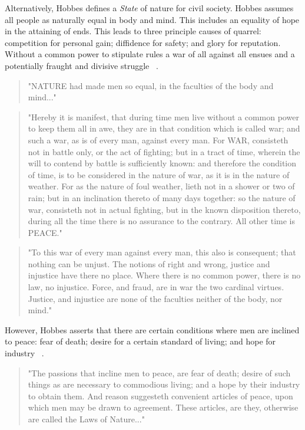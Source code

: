 \documentclass[11pt, oneside]{article}   	%
\begin{document}
Alternatively, Hobbes defines a \emph{State} of nature for civil society.
Hobbes assumes all people as naturally equal in body and mind.
This includes an equality of hope in the attaining of ends.
This leads to three principle causes of quarrel: competition for personal gain; diffidence for safety; and glory for reputation. Without a common power to stipulate rules a war of all against all ensues and a potentially fraught and divisive struggle ~\cite{th1}.

\begin{quote}
"NATURE had made men so equal, in the faculties of the body and mind..."
\end{quote}
\begin{quote}
"Hereby it is manifest, that during time men live without a common power to keep them all in awe, they are in that condition which is called war; and such a war, as is of every man, against every man. For WAR, consisteth not in battle only, or the act of fighting; but in a tract of time, wherein the will to contend by battle is sufficiently known: and therefore the condition of time, is to be considered in the nature of war, as it is in the nature of weather. For as the nature of foul weather, lieth not in a shower or two of rain; but in an inclination thereto of many days together: so the nature of war, consisteth not in actual fighting, but in the known disposition thereto, during all the time there is no assurance to the contrary. All other time is PEACE."
\end{quote}
\begin{quote}
"To this war of every man against every man, this also is consequent; that nothing can be unjust. The notions of right and wrong, justice and injustice have there no place. Where there is no common power, there is no law, no injustice. Force, and fraud, are in war the two cardinal virtues. Justice, and injustice are none of the faculties neither of the body, nor mind."
\end{quote}

However, Hobbes asserts that there are certain conditions where men are inclined to peace: fear of death; desire for a certain standard of living; and hope for industry ~\cite{th1}.

\begin{quote}
"The passions that incline men to peace, are fear of death; desire of such things as are necessary to commodious living; and a hope by their industry to obtain them. And reason suggesteth convenient articles of peace, upon which men may be drawn to agreement. These articles, are they, otherwise are called the Laws of Nature..."
\end{quote}
\end{document}
